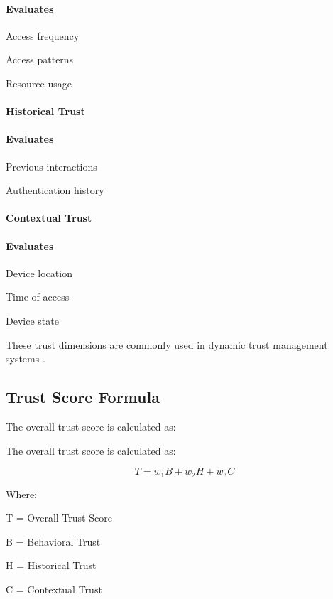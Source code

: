 \paragraph{Evaluates}

Access frequency


Access patterns


Resource usage


\paragraph{Historical Trust}

\paragraph{Evaluates}

Previous interactions


Authentication history


\paragraph{Contextual Trust}

\paragraph{Evaluates}

Device location


Time of access


Device state


These trust dimensions are commonly used in dynamic trust management systems .


\subsection{Trust Score Formula}

The overall trust score is calculated as:


The overall trust score is calculated as:

\begin{equation}
  T = w_1 B + w_2 H + w_3 C
  \label{eq:trust-score}
\end{equation}

Where:


T = Overall Trust Score


B = Behavioral Trust


H = Historical Trust


C = Contextual Trust


